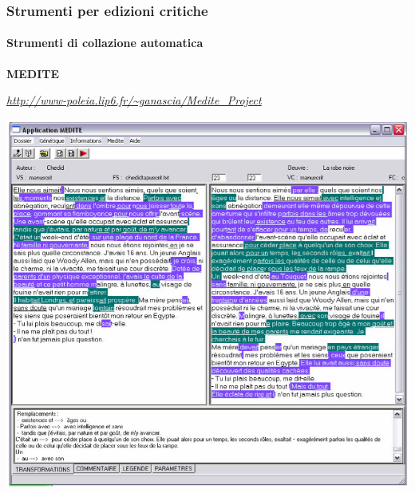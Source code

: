 \begin{frame}
    \frametitle{Strumenti per edizioni critiche}
    \framesubtitle{Strumenti di collazione automatica}
	\addtocounter{nframe}{1}
    \begin{center}
        \textbf{MEDITE}
    \end{center}
    \begin{center}
        \textit{\url{http://www-poleia.lip6.fr/~ganascia/Medite\_Project}}
	\end{center}
    \begin{center}
        \includegraphics[width=.95\textwidth]{imgs/medite.png}
	\end{center}
\end{frame}


